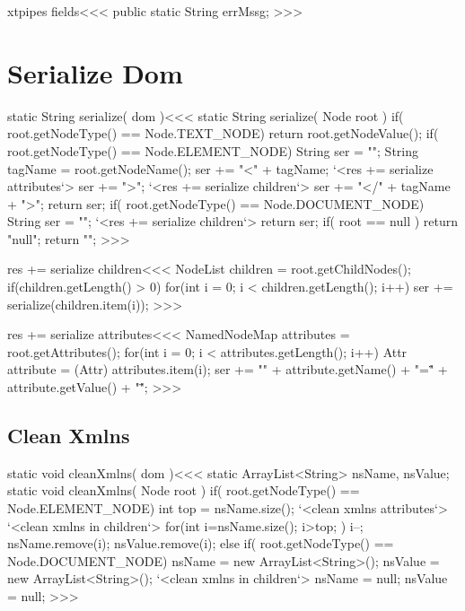 \documentclass{article}
\begin{document}
\<xtpipes fields\><<<
public static String errMssg;
>>>

\section{Serialize Dom}


\<static String serialize( dom )\><<<
static String serialize( Node root ){
   if( root.getNodeType() == Node.TEXT_NODE) {
         return root.getNodeValue();
   }
   if( root.getNodeType() == Node.ELEMENT_NODE) {
      String ser = "";
      String tagName = root.getNodeName();
      ser += "<" + tagName;
      `<res += serialize attributes`>
      ser += "\n>";
      `<res += serialize children`>
      ser += "</" + tagName + ">";
      return ser;
   }
   if( root.getNodeType() == Node.DOCUMENT_NODE) {
      String ser = "";
      `<res += serialize children`>
      return ser;
   }
   if( root == null ){ return "null"; }
   return "";
}
>>>

\<res += serialize children\><<<
NodeList children = root.getChildNodes();
if(children.getLength() > 0) {
   for(int i = 0; i < children.getLength(); i++) {
      ser += serialize(children.item(i));
}  }
>>>

\<res += serialize attributes\><<<
NamedNodeMap attributes = root.getAttributes();
for(int i = 0; i < attributes.getLength(); i++) {
   Attr attribute = (Attr) attributes.item(i);
   ser += "\n" + attribute.getName() + "=\""
               + attribute.getValue() + "\" ";
}
>>>




\subsection{Clean Xmlns}


\<static void cleanXmlns( dom )\><<<
static ArrayList<String> nsName, nsValue;
static void cleanXmlns( Node root ){
   if( root.getNodeType() == Node.ELEMENT_NODE) {
      int top = nsName.size();
      `<clean xmlns attributes`>
      `<clean xmlns in children`>
       for(int i=nsName.size(); i>top; ){
         i--;
         nsName.remove(i);
         nsValue.remove(i);
       }
   } else if( root.getNodeType() == Node.DOCUMENT_NODE) {
      nsName = new ArrayList<String>();
      nsValue = new ArrayList<String>();
      `<clean xmlns in children`>
      nsName = null;
      nsValue = null;
}  }
>>>
\end{document}
